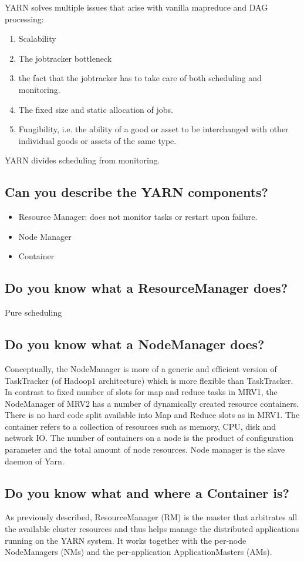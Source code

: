 \documentclass{article}
\begin{document}
YARN solves multiple issues that arise with vanilla mapreduce and DAG processing:
\begin{enumerate}
\item Scalability
\item The jobtracker bottleneck
\item the fact that the jobtracker has to take care of both scheduling and monitoring.
\item The fixed size and static allocation of jobs.
\item Fungibility, i.e. the ability of a good or asset to be interchanged with other individual goods or assets of the same type.
\end{enumerate}

YARN divides scheduling from monitoring.

\subsection{Can you describe the YARN components?}

\begin{itemize}
\item Resource Manager: does not monitor tasks or restart upon failure.
\item Node Manager
\item Container
\end{itemize}

\subsection{Do you know what a ResourceManager does?}
Pure scheduling
\subsection{Do you know what a NodeManager does?}
Conceptually, the NodeManager is more of a generic and efficient version of TaskTracker (of Hadoop1 architecture) which is more flexible than TaskTracker. In contrast to fixed number of slots for map and reduce tasks in MRV1, the NodeManager of MRV2 has a number of dynamically created resource containers. There is no hard code split available into Map and Reduce slots as in MRV1. The container refers to a collection of resources such as memory, CPU, disk and network IO. The number of containers on a node is the product of configuration parameter and the total amount of node resources. Node manager is the slave daemon of Yarn.

\subsection{Do you know what and where a Container is?}
As previously described, ResourceManager (RM) is the master that arbitrates all the available cluster resources and thus helps manage the distributed applications running on the YARN system. It works together with the per-node NodeManagers (NMs) and the per-application ApplicationMasters (AMs).
\end{document}
